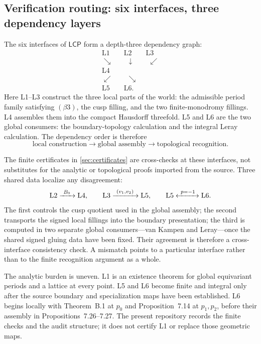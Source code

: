 \documentclass[11pt,reqno]{amsart}
\numberwithin{equation}{section}
\newcommand{\LCP}{\mathsf{LCP}}
\theoremstyle{definition}
\begin{document}
\subsection{Verification routing: six interfaces, three dependency layers}
\label{sec:verification-routing}

The six interfaces of $\LCP$ form a depth-three dependency graph:
\[
\begin{gathered}
\mathrm{L1}\qquad \mathrm{L2}\qquad \mathrm{L3}
\\[-2pt]
\searrow\qquad \downarrow\qquad \swarrow
\\[-2pt]
\mathrm{L4}
\\[-2pt]
\swarrow\qquad\searrow
\\[-2pt]
\mathrm{L5}\qquad\mathrm{L6}.
\end{gathered}
\]
Here L1--L3 construct the three local parts of the world: the admissible period family satisfying $(\beta3)$, the cusp filling, and the two finite-monodromy fillings. L4 assembles them into the compact Hausdorff threefold. L5 and L6 are the two global consumers: the boundary-topology calculation and the integral Leray calculation. The dependency order is therefore
\[
\text{local construction}
\longrightarrow
\text{global assembly}
\longrightarrow
\text{topological recognition}.
\]

The finite certificates in \cref{sec:certificates} are cross-checks at these interfaces, not substitutes for the analytic or topological proofs imported from the source. Three shared data localize any disagreement:
\[
\mathrm{L2}\xrightarrow{\ B_0\ }\mathrm{L4},
\qquad
\mathrm{L3}\xrightarrow{\ (v_1,v_2)\ }\mathrm{L5},
\qquad
\mathrm{L5}\xleftrightarrow{\ p=-1\ }\mathrm{L6}.
\]
The first controls the cusp quotient used in the global assembly; the second transports the signed local fillings into the boundary presentation; the third is computed in two separate global consumers---van Kampen and Leray---once the shared signed gluing data have been fixed. Their agreement is therefore a cross-interface consistency check. A mismatch points to a particular interface rather than to the finite recognition argument as a whole.

The analytic burden is uneven. L1 is an existence theorem for global equivariant periods and a lattice at every point. L5 and L6 become finite and integral only after the source boundary and specialization maps have been established. L6 begins locally with Theorem~B.1 at $p_0$ and Proposition~7.14 at $p_1,p_2$, before their assembly in Propositions~7.26--7.27. The present repository records the finite checks and the audit structure; it does not certify L1 or replace those geometric maps.
\end{document}

